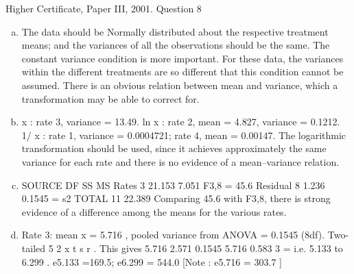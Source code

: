 \documentclass[a4paper,12pt]{article}
\begin{document}
Higher Certificate, Paper III, 2001. Question 8
\begin{enumerate}[(a)]
\item The data should be Normally distributed about the respective treatment means;
and the variances of all the observations should be the same. The constant variance
condition is more important. For these data, the variances within the different
treatments are so different that this condition cannot be assumed. There is an obvious
relation between mean and variance, which a transformation may be able to correct
for.
\item  x : rate 3, variance = 13.49.
ln x : rate 2, mean = 4.827, variance = 0.1212.
1/ x : rate 1, variance = 0.0004721;
rate 4, mean = 0.00147.
The logarithmic transformation should be used, since it achieves approximately the
same variance for each rate and there is no evidence of a mean–variance relation.
\item 
SOURCE DF SS MS
Rates 3 21.153 7.051 F3,8 = 45.6
Residual 8 1.236 0.1545 = s2
TOTAL 11 22.389
Comparing 45.6 with F3,8, there is strong evidence of a difference among the means
for the various rates.
\item Rate 3: mean x = 5.716 , pooled variance from ANOVA = 0.1545 (8df).
Two-tailed 5%
2
x t s
r
\pm  .
This gives 5.716 2.571 0.1545 5.716 0.583
3
\pm  = \pm  i.e. 5.133 to 6.299 .
e5.133 =169.5; e6.299 = 544.0 [Note : e5.716 = 303.7 ]

\end{enumerate}
\end{document}
